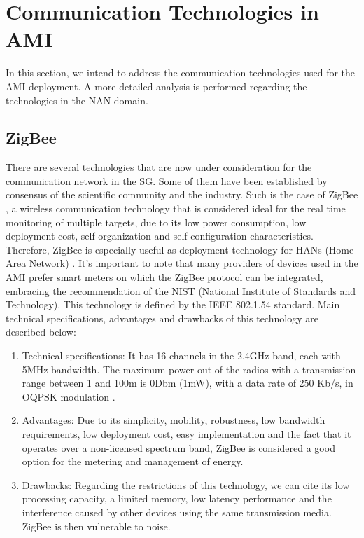 \documentclass[11pt,final,onecolumn]{IEEEtran}
\begin{document}
\section{Communication Technologies in AMI}\label{technologies}

In this section, we intend to address the communication technologies used for the AMI deployment. A more detailed analysis is performed regarding the technologies in the NAN domain.

\subsection{ZigBee}

There are several technologies that are now under consideration for the communication network in the SG. Some of them have been established by consensus of the scientific community and the industry. Such is the case of ZigBee \cite{Alliance2010}, a wireless communication technology that is considered ideal for the real time monitoring of multiple targets, due to its low power consumption, low deployment cost, self-organization and self-configuration characteristics. Therefore, ZigBee is especially useful as deployment technology for HANs (Home Area Network) \cite{Sabbah2014}. It’s important to note that many providers of devices used in the AMI prefer smart meters on which the ZigBee protocol can be integrated, embracing the recommendation of the NIST (National Institute of Standards and Technology). This technology is defined by the IEEE 802.1.54 standard. Main technical specifications, advantages and drawbacks of this technology are described below:

\begin{enumerate}
	\item Technical specifications: It has 16 channels in the 2.4GHz band, each with 5MHz bandwidth. The maximum power out of the radios with a transmission range between 1 and 100m is 0Dbm (1mW), with a data rate of 250 Kb/s, in OQPSK modulation \cite{Sabbah2014}.
	\item Advantages: Due to its simplicity, mobility, robustness, low bandwidth requirements, low deployment cost, easy implementation and the fact that it operates over a non-licensed spectrum band, ZigBee is considered a good option for the metering and management of energy.
	\item Drawbacks: Regarding the restrictions of this technology, we can cite its low processing capacity, a limited memory, low latency performance and the interference caused by other devices using the same transmission media. ZigBee is then vulnerable to noise.
\end{enumerate}
\end{document}
